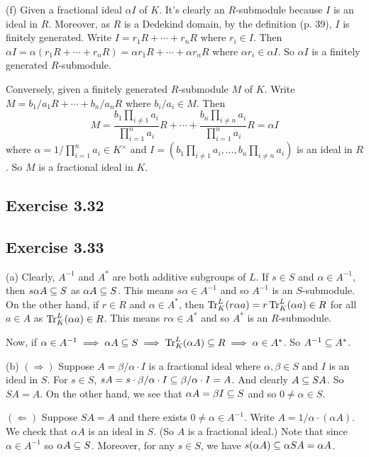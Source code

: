 \documentclass[../Marcus.tex]{subfiles}
\begin{document}
(f) Given a fractional ideal $\alpha I$ of $K$. It's clearly an $R$-submodule because $I$ is an ideal in $R$. Moreover, as $R$ is a Dedekind domain, by the definition (p. 39), $I$ is finitely generated. Write $I=r_1R+\cdots+r_nR$ where $r_i\in I$. Then $\alpha I=\alpha(r_1R+\cdots+r_nR)=\alpha r_1R+\cdots+\alpha r_nR$ where $\alpha r_i\in\alpha I$. So $\alpha I$ is a finitely generated $R$-submodule. 

Conversely, given a finitely generated $R$-submodule $M$ of $K$. Write $M=b_1/a_1R+\cdots+b_n/a_nR$ where $b_i/a_i\in M$. Then $$M=\frac{b_1 \prod_{i\neq1} a_i}{\prod_{i=1}^n a_i}R+\cdots+\frac{b_n \prod_{i\neq n} a_i}{\prod_{i=1}^n a_i}R=\alpha I$$ where $\alpha=1/\prod_{i=1}^n a_i\in K^\times$ and $I=(b_1 \prod_{i\neq1} a_i,\ldots,b_n \prod_{i\neq n} a_i)$ is an ideal in $R$. So $M$ is a fractional ideal in $K$.

\subsection*{Exercise 3.32}

\subsection*{Exercise 3.33}

(a) Clearly, $A^{-1}$ and $A^*$ are both additive subgroups of $L$. If $s\in S$ and $\alpha\in A^{-1}$, then $s\alpha A\subseteq S$ as $\alpha A \subseteq S$. This means $s\alpha \in A^{-1}$ and so $A^{-1}$ is an $S$-submodule. On the other hand, if $r\in R$ and $\alpha\in A^*$, then $\operatorname{Tr}^L_K (r\alpha a) = r \operatorname{Tr}^L_K(\alpha a) \in R$ for all $a\in A$ as $\operatorname{Tr}^L_K(\alpha a) \in R$. This means $r\alpha \in A^*$ and so $A^*$ is an $R$-submodule.

Now, if $\alpha\in A^{-1} \implies \alpha A\subseteq S \implies \operatorname{Tr}^L_K(\alpha A) \subseteq R \implies \alpha \in A^*$. So $A^{-1} \subseteq A^*$.

(b) $(\Rightarrow)$ Suppose $A=\beta/\alpha \cdot I$ is a fractional ideal where $\alpha,\beta \in S$ and $I$ is an ideal in $S$. For $s\in S$, $sA = s \cdot \beta/\alpha \cdot I \subseteq \beta/\alpha \cdot I = A$. And clearly $A \subseteq SA$. So $SA=A$. On the other hand, we see that $\alpha A = \beta I \subseteq S$ and so $0\neq\alpha\in S$.

$(\Leftarrow)$ Suppose $SA=A$ and there exists $0\neq \alpha \in A^{-1}$. Write $A = 1/\alpha \cdot (\alpha A)$. We check that $\alpha A$ is an ideal in $S$. (So $A$ is a fractional ideal.) Note that since $\alpha \in A^{-1}$ so $\alpha A \subseteq S$. Moreover, for any $s\in S$, we have $s(\alpha A) \subseteq \alpha SA = \alpha A$.
\end{document}
